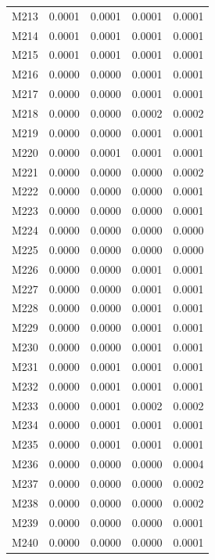 \begin{longtable}{lrrrr}
M213 & 0.0001 & 0.0001 & 0.0001 & 0.0001 \\
M214 & 0.0001 & 0.0001 & 0.0001 & 0.0001 \\
M215 & 0.0001 & 0.0001 & 0.0001 & 0.0001 \\
M216 & 0.0000 & 0.0000 & 0.0001 & 0.0001 \\
M217 & 0.0000 & 0.0000 & 0.0001 & 0.0001 \\
M218 & 0.0000 & 0.0000 & 0.0002 & 0.0002 \\
M219 & 0.0000 & 0.0000 & 0.0001 & 0.0001 \\
M220 & 0.0000 & 0.0001 & 0.0001 & 0.0001 \\
M221 & 0.0000 & 0.0000 & 0.0000 & 0.0002 \\
M222 & 0.0000 & 0.0000 & 0.0000 & 0.0001 \\
M223 & 0.0000 & 0.0000 & 0.0000 & 0.0001 \\
M224 & 0.0000 & 0.0000 & 0.0000 & 0.0000 \\
M225 & 0.0000 & 0.0000 & 0.0000 & 0.0000 \\
M226 & 0.0000 & 0.0000 & 0.0001 & 0.0001 \\
M227 & 0.0000 & 0.0000 & 0.0001 & 0.0001 \\
M228 & 0.0000 & 0.0000 & 0.0001 & 0.0001 \\
M229 & 0.0000 & 0.0000 & 0.0001 & 0.0001 \\
M230 & 0.0000 & 0.0000 & 0.0001 & 0.0001 \\
M231 & 0.0000 & 0.0001 & 0.0001 & 0.0001 \\
M232 & 0.0000 & 0.0001 & 0.0001 & 0.0001 \\
M233 & 0.0000 & 0.0001 & 0.0002 & 0.0002 \\
M234 & 0.0000 & 0.0001 & 0.0001 & 0.0001 \\
M235 & 0.0000 & 0.0001 & 0.0001 & 0.0001 \\
M236 & 0.0000 & 0.0000 & 0.0000 & 0.0004 \\
M237 & 0.0000 & 0.0000 & 0.0000 & 0.0002 \\
M238 & 0.0000 & 0.0000 & 0.0000 & 0.0002 \\
M239 & 0.0000 & 0.0000 & 0.0000 & 0.0001 \\
M240 & 0.0000 & 0.0000 & 0.0000 & 0.0001 \\
\end{longtable}
